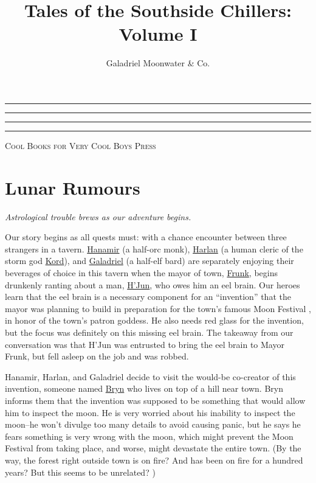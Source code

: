 \documentclass[smalldemyvopaper,11pt,twoside,onecolumn,openright,extrafontsizes]{memoir}
\title{Tales of the Southside Chillers: Volume I}
\author{Galadriel Moonwater \& Co.}
\newcommand{\chapdesc}[1]{
    \begin{flushright}
    \emph{{#1}}
    \end{flushright}
    \vspace{26pt}
}
\newcommand{\press}{Cool Books for Very Cool Boys Press}
\newcommand*\halftitlepage{\begingroup %
  \setlength\drop{0.1\textheight}
  \begin{center}
  \vspace*{\drop}
  \rule{\textwidth}{0in}\par
  {\Large\textsc\thetitle\par}
  \rule{\textwidth}{0in}\par
  \vfill
  \end{center}
\endgroup}
\newlength\drop
\newcommand*\titleM{\begingroup %
  \setlength\drop{0.15\textheight}
  \begin{center}
  \vspace*{\drop}
  \rule{\textwidth}{0in}\par
  {\HUGE\textsc\thetitle\par}
  \rule{\textwidth}{0in}\par
  {\Large\textit\theauthor\par}
  \vfill
  {\Large\scshape\press}
  \end{center}
\endgroup}
\begin{document}
\pagestyle{empty}
\halftitlepage
\cleardoublepage
\titleM
\clearpage


\frontmatter
\pagestyle{mystyle}
\clearpage
\tableofcontents*

\mainmatter

\chapter{Lunar Rumours}
\chapdesc{Astrological trouble brews as our adventure begins.}

Our story begins as all quests must: with a chance encounter between
three strangers in a tavern. \href{/characters/hanamir/}{Hanamir} (a
half-orc monk), \href{/characters/harlan/}{Harlan} (a human cleric of
the storm god \href{/characters/kord/}{Kord}), and
\href{/characters/galadriel/}{Galadriel} (a half-elf bard) are
separately enjoying their beverages of choice in this tavern when the
mayor of town, \href{/characters/frunk/}{Frunk}, begins drunkenly
ranting about a man, \href{/characters/hjun/}{H'Jun}, who owes him an
eel brain. Our heroes learn that the eel brain is a necessary component
for an ``invention'' that the mayor was planning to build in preparation
for the town's famous Moon Festival , in honor of the town's patron
goddess. He also needs red glass for the invention, but the focus was
definitely on this missing eel brain. The takeaway from our conversation
was that H'Jun was entrusted to bring the eel brain to Mayor Frunk, but
fell asleep on the job and was robbed.

Hanamir, Harlan, and Galadriel decide to visit the would-be co-creator
of this invention, someone named \href{/characters/bryn/}{Bryn} who
lives on top of a hill near town. Bryn informs them that the invention
was supposed to be something that would allow him to inspect the moon.
He is very worried about his inability to inspect the moon--he won't
divulge too many details to avoid causing panic, but he says he fears
something is very wrong with the moon, which might prevent the Moon
Festival from taking place, and worse, might devastate the entire town.
(By the way, the forest right outside town is on fire? And has been on
fire for a hundred years? But this seems to be unrelated? )
\end{document}
